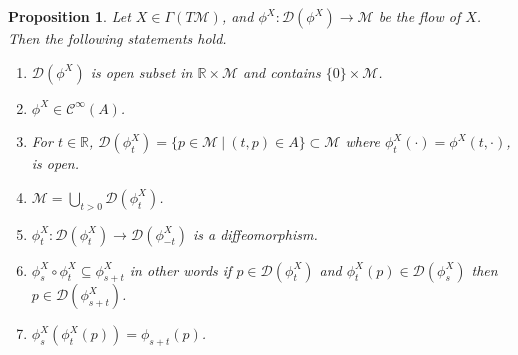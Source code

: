 \documentclass[10pt]{article}
\newtheorem{proposition}{Proposition}[section]
\newcommand{\R}[0]{\mathbb{R}}
\newcommand{\M}[0]{\mathcal{M}}
\newcommand{\sep}[0]{\:|\:}
\begin{document}
\begin{proposition}
  Let $X\in\Gamma(T\M)$, and $\phi^X:\mathcal{D}(\phi^X)\to \M$ be the flow of $X$. Then the following statements hold.
  \begin{enumerate}[1).]
    \item $\mathcal{D}(\phi^X)$ is open subset in $\R\times \M$ and contains $\{0\}\times\M$. 
    \item $\phi^X\in\mathcal{C}^\infty(A)$.
    \item For $t\in\R$, $\mathcal{D}(\phi^X_t) = \{p\in\M\sep (t,p)\in A\}\subset\M$  where $\phi_t^X(\cdot) = \phi^X(t,\cdot)$, is open. 
    \item $\M = \bigcup_{t>0}\mathcal{D}(\phi^X_t)$.
    \item $\phi_t^X:\mathcal{D}(\phi_t^X)\to\mathcal{D}(\phi^X_{-t})$ is a diffeomorphism.
    \item $\phi^X_s\circ\phi^X_t \subseteq \phi_{s+t}^X$ in other words if $p\in\mathcal{D}(\phi_t^X)$ and $\phi_t^X(p)\in\mathcal{D}(\phi_{s}^X)$ then $p\in\mathcal{D}(\phi^X_{s+t})$.
    \item $\phi^X_s(\phi_t^X(p)) = \phi_{s+t}(p)$.
  \end{enumerate}
\end{proposition}
\setcounter{claim}{0}
\end{document}
